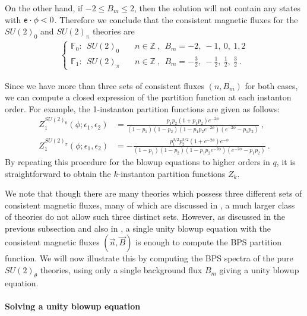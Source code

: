 On the other hand, if $-2\le B_m\le 2$, then the solution will not contain any states with ${\sf{e}}\cdot\phi<0$. Therefore we conclude that the consistent magnetic fluxes for the $SU(2)_0$ and $SU(2)_\pi$ theories are
\begin{align}
\left\{
\begin{array}{ll}
\mathbb{F}_0:~~SU(2)_0 & \quad n\in\mathbb{Z} \ , \ \ B_m = -2,\ -1,\ 0,\ 1, 2 \\
\mathbb{F}_1:~~SU(2)_\pi & \quad n\in\mathbb{Z} \ , \ \  B_m =-\frac{3}{2},\ -\frac{1}{2},\ \frac{1}{2},\ \frac{3}{2}\ .
\end{array}\right. \label{eq:su2 three choices of B}
\end{align}

Since we have more than three sets of consistent fluxes $(n,B_m)$ for both cases, we can compute  a closed expression of the partition function at each instanton order. For example, the 1-instanton partition functions are given as follows:
\begin{align}
Z_1^{SU(2)_0}(\phi; \epsilon_1, \epsilon_2)
&= \frac{p_1 p_2 (1+p_1 p_2)e^{-2\phi}}{(1-p_1)(1-p_2)(1-p_1 p_2 e^{-2\phi})(e^{-2\phi}-p_1p_2)}\ , \label{eq:SU2_0Z-1instanton}\\
Z_1^{SU(2)_\pi}(\phi; \epsilon_1, \epsilon_2)
&= -\frac{p_1^{3/2} p_2^{3/2}(1+e^{-2\phi})e^{-\phi}}{ (1-p_1)(1-p_2) (1-p_1 p_2 e^{-2\phi})(e^{-2\phi}-p_1 p_2)}\ . \label{eq:SU2_piZ-1instanton}
\end{align}
By repeating this procedure for the blowup equations to higher orders in $q$, it is straightforward to obtain the $k$-instanton partition functions $Z_k$. 

We note that though there are many theories which possess three different sets of consistent magnetic fluxes, many of which are discussed in \cite{Kim:2019uqw}, a much larger class of theories do not allow such three distinct sets. However, as discussed in the previous subsection and also in \cite{Huang:2017mis,Gu:2019pqj}, a single unity blowup equation with the consistent magnetic fluxes $(\vec{n},\vec{B})$ is enough to compute the BPS partition function. We will now illustrate this by computing the BPS spectra of the pure $SU(2)_\theta$ theories, using only a single background flux $B_m$ giving a unity blowup equation.

\paragraph{Solving a unity blowup equation}

